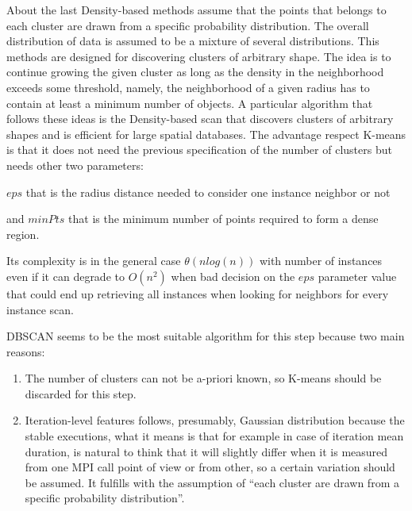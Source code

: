 About the last Density-based methods assume that the points that belongs to
each cluster are
drawn from a specific probability distribution. The overall distribution of data
is assumed to be a mixture of several distributions. This methods are designed
for discovering clusters of arbitrary shape. The idea is to continue growing the
given cluster as long as the density in the neighborhood exceeds some threshold,
namely, the neighborhood of a given radius has to contain at least a minimum
number of objects. A particular algorithm that follows these ideas is the
Density-based scan that discovers clusters of arbitrary shapes and is efficient
for large spatial databases. The advantage respect K-means is that it does not
need the previous specification of the number of clusters but needs other two
parameters:
\begin{enumerate*}[label=\roman*)]
  \item $eps$ that is the radius distance needed to consider one instance neighbor
    or not 
  \item and $minPts$ that is the minimum number of points required to form a dense
    region.
\end{enumerate*}
Its complexity is in the general case $\theta(nlog(n))$ with number of instances
even if it can degrade to $O(n^{2})$ when bad decision on the $eps$ parameter
value that could end up retrieving all instances when looking for neighbors for
every instance scan.

DBSCAN seems to be the most suitable algorithm for this step because two main
reasons:
\begin{enumerate}[label=\roman*)]
  \item The number of clusters can not be a-priori known, so K-means should be
    discarded for this step.
  \item Iteration-level features follows, presumably, Gaussian distribution
    because the stable executions, what it means is that for example in case of
    iteration mean duration, is natural to think  that it will slightly differ
    when it is measured from one MPI call point of view or from other,
    so a certain variation should be assumed. It fulfills with the assumption 
    of ``each cluster are drawn from a specific
    probability distribution''.
\end{enumerate}

